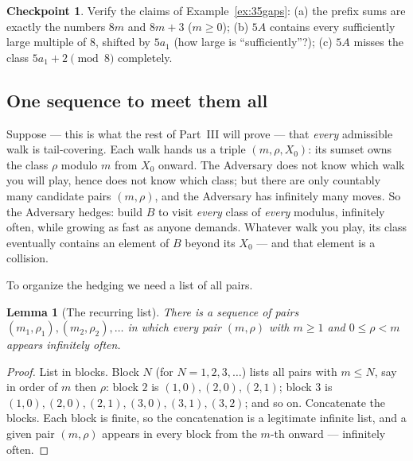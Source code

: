 \documentclass[11pt,reqno]{amsart}
\theoremstyle{plain}
\newtheorem{lemma}[theorem]{Lemma}
\theoremstyle{definition}
\newtheorem{checkpoint}[theorem]{Checkpoint}   %
\theoremstyle{remark}
\begin{document}
\begin{checkpoint}
Verify the claims of Example~\ref{ex:35gaps}: (a) the prefix sums are exactly the
numbers $8m$ and $8m+3$ ($m \ge 0$); (b) $5A$ contains every sufficiently large
multiple of $8$, shifted by $5a_1$ (how large is ``sufficiently''?); (c) $5A$ misses
the class $5a_1 + 2 \pmod 8$ completely.
\end{checkpoint}

\subsection{One sequence to meet them all}

Suppose --- this is what the rest of Part~III will prove --- that \emph{every}
admissible walk is tail-covering. Each walk hands us a triple $(m, \rho, X_0)$: its
sumset owns the class $\rho$ modulo $m$ from $X_0$ onward. The Adversary does not
know which walk you will play, hence does not know which class; but there are only
countably many candidate pairs $(m, \rho)$, and the Adversary has infinitely many
moves. So the Adversary hedges: build $B$ to visit \emph{every} class of
\emph{every} modulus, infinitely often, while growing as fast as anyone demands.
Whatever walk you play, its class eventually contains an element of $B$ beyond its
$X_0$ --- and that element is a collision.

To organize the hedging we need a list of all pairs.

\begin{lemma}[The recurring list]\label{lem:enum}
There is a sequence of pairs $(m_1, \rho_1), (m_2, \rho_2), \dots$ in which every
pair $(m, \rho)$ with $m \ge 1$ and $0 \le \rho < m$ appears infinitely often.
\end{lemma}

\begin{proof}
List in blocks. Block $N$ (for $N = 1, 2, 3, \dots$) lists all pairs with
$m \le N$, say in order of $m$ then $\rho$: block $2$ is
$(1,0), (2,0), (2,1)$; block $3$ is $(1,0), (2,0), (2,1), (3,0), (3,1), (3,2)$; and
so on. Concatenate the blocks. Each block is finite, so the concatenation is a
legitimate infinite list, and a given pair $(m, \rho)$ appears in every block from
the $m$-th onward --- infinitely often.
\end{proof}
\end{document}
